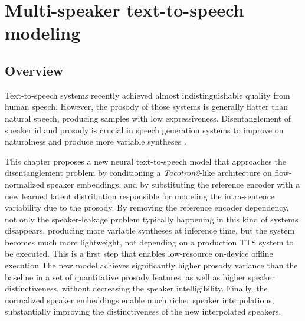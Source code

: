 \chapter{Multi-speaker text-to-speech modeling} \label{ch:tts}
\section{Overview}
Text-to-speech systems recently achieved almost indistinguishable quality from human speech. However, the prosody of those systems is generally flatter than natural speech, producing samples with low expressiveness. Disentanglement of speaker id and prosody is crucial in speech generation systems to improve on naturalness and produce more variable syntheses \autocite{markovi2015}. 

This chapter proposes a new neural text-to-speech model that approaches the disentanglement problem by conditioning a \textit{Tacotron2}-like architecture on flow-normalized speaker embeddings, and by substituting the reference encoder with a new learned latent distribution responsible for modeling the intra-sentence variability due to the prosody. By removing the reference encoder dependency, not only the speaker-leakage problem typically happening in this kind of systems disappears, producing more variable syntheses at inference time, but the system becomes much more lightweight, not depending on a production TTS system to be executed. This is a first step that enables low-resource on-device offline execution The new model achieves significantly higher prosody variance than the baseline in a set of quantitative prosody features, as well as higher speaker distinctiveness, without decreasing the speaker intelligibility. Finally, the normalized speaker embeddings enable much richer speaker interpolations, substantially improving the distinctiveness of the new interpolated speakers.


